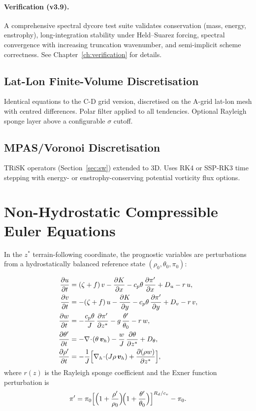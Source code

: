 \documentclass[11pt,twoside]{report}
\newcommand{\pp}{\partial}
\newcommand{\Rd}{R_d}
\newcommand{\cpd}{c_p}
\newcommand{\cvd}{c_v}
\newcommand{\vect}[1]{\bm{#1}}
\newcommand{\grad}{\nabla}
\newcommand{\divg}{\nabla\!\cdot\!}
\begin{document}
\paragraph{Verification (v3.9).}
A comprehensive spectral dycore test suite validates conservation
(mass, energy, enstrophy), long-integration stability under
Held--Suarez forcing, spectral convergence with increasing truncation
wavenumber, and semi-implicit scheme correctness.  See
Chapter~\ref{ch:verification} for details.

\subsection{Lat-Lon Finite-Volume Discretisation}

Identical equations to the C-D grid version, discretised on the A-grid
lat-lon mesh with centred differences.  Polar filter applied to all
tendencies.  Optional Rayleigh sponge layer above a configurable
$\sigma$ cutoff.

\subsection{MPAS/Voronoi Discretisation}

TRiSK operators (Section~\ref{sec:sw}) extended to 3D.  Uses RK4 or
SSP-RK3 time stepping with energy- or enstrophy-conserving potential
vorticity flux options.


\section{Non-Hydrostatic Compressible Euler Equations}
\label{sec:nh}

In the $z^*$ terrain-following coordinate, the prognostic variables are
perturbations from a hydrostatically balanced reference state
$(\rho_0,\theta_0,\pi_0)$:

\begin{align}
  \frac{\pp u}{\pp t} &= (\zeta+f)\,v - \frac{\pp K}{\pp x}
  - \cpd\theta\,\frac{\pp\pi'}{\pp x} + D_u - r\,u,
  \label{eq:nh-u}\\
  \frac{\pp v}{\pp t} &= -(\zeta+f)\,u - \frac{\pp K}{\pp y}
  - \cpd\theta\,\frac{\pp\pi'}{\pp y} + D_v - r\,v,
  \label{eq:nh-v}\\
  \frac{\pp w}{\pp t} &= -\frac{\cpd\theta}{J}\,\frac{\pp\pi'}{\pp z^*}
  - g\,\frac{\theta'}{\theta_0} - r\,w,
  \label{eq:nh-w}\\
  \frac{\pp\theta'}{\pp t} &= -\divg(\theta\,\vect{v}_h)
  - \frac{w}{J}\,\frac{\pp\theta}{\pp z^*} + D_\theta,
  \label{eq:nh-theta}\\
  \frac{\pp\rho'}{\pp t} &= -\frac{1}{J}
  \Bigl[\grad_h\!\cdot\!(J\rho\,\vect{v}_h)
  + \frac{\pp(\rho w)}{\pp z^*}\Bigr],
  \label{eq:nh-rho}
\end{align}
where $r(z)$ is the Rayleigh sponge coefficient and the Exner function
perturbation is
\begin{equation}
  \pi' = \pi_0\Bigl[\Bigl(1+\frac{\rho'}{\rho_0}\Bigr)\!
  \Bigl(1+\frac{\theta'}{\theta_0}\Bigr)\Bigr]^{\Rd/\cvd}-\pi_0.
\end{equation}
\end{document}
